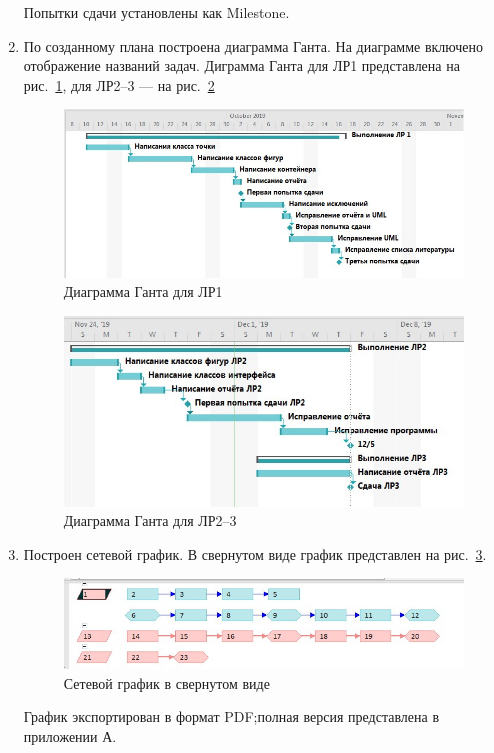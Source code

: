 \documentclass[a4paper, 14pt]{extarticle}
\begin{document}
\begin{enumerate}
    Попытки сдачи установлены как Milestone.

    \item По созданному плана построена диаграмма Ганта. На диаграмме включено отображение названий задач. Диграмма Ганта для ЛР1 представлена на рис.~\ref{img:gantt1}, для ЛР2--3 --- на рис.~\ref{img:gantt2}

    \begin{figure}[h]
        \centering
        \includegraphics[width=\textwidth]{img/S003.jpg}
        \caption{Диаграмма Ганта для ЛР1}%
        \label{img:gantt1}
    \end{figure}
    
    \begin{figure}[h]
        \centering
        \includegraphics[width=\textwidth]{img/S004.jpg}
        \caption{Диаграмма Ганта для ЛР2--3}%
        \label{img:gantt2}
    \end{figure}
    
    \FloatBarrier{}
    
    \item Построен сетевой график. В свернутом виде график представлен на рис.~\ref{img:network}.

    \begin{figure}[h]
        \centering
        \includegraphics[width=\textwidth]{img/S005.jpg}
        \caption{Сетевой график в свернутом виде}%
        \label{img:network}
    \end{figure}
    
    График экспортирован в формат PDF;\@ полная версия представлена в приложении А.
\end{enumerate}
\end{document}
